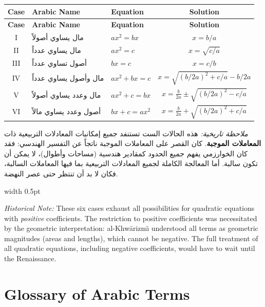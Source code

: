 \documentclass[10pt,a4paper]{book}
\newlength{\colwidth}
\newcommand{\bilingualpair}[2]{%
  \noindent
  \begin{minipage}[t]{\colwidth}
  \begin{flushright}
  \vspace{0pt}
  {\arabicfont\small #1}
  \end{flushright}
  \end{minipage}%
  \hfill\textcolor{columnsepclr}{\vrule width 0.5pt}\hfill
  \begin{minipage}[t]{\colwidth}
  \vspace{0pt}
  {\small #2}
  \end{minipage}%
  \par\vspace{0.6em}
}
\newcommand{\cnote}[1]{\textcolor{notecolor}{\textit{#1}}}
\begin{document}
\vspace{0.5em}
\begin{center}
\renewcommand{\arraystretch}{1.6}
\begin{longtable}{|c|l|l|c|}
\hline
\textbf{Case} & \textbf{Arabic Name} & \textbf{Equation} & \textbf{Solution} \\
\hline
\endfirsthead
\hline
\textbf{Case} & \textbf{Arabic Name} & \textbf{Equation} & \textbf{Solution} \\
\hline
\endhead
\hline
\endfoot
I & مال يساوي أصولاً & $ax^2 = bx$ & $x = b/a$ \\
\hline
II & مال يساوي عدداً & $ax^2 = c$ & $x = \sqrt{c/a}$ \\
\hline
III & أصول تساوي عدداً & $bx = c$ & $x = c/b$ \\
\hline
IV & مال وأصول يساوي عدداً & $ax^2 + bx = c$ & $x = \sqrt{(b/2a)^2 + c/a} - b/2a$ \\
\hline
V & مال وعدد يساوي أصولاً & $ax^2 + c = bx$ & $x = \frac{b}{2a} \pm \sqrt{(b/2a)^2 - c/a}$ \\
\hline
VI & أصول وعدد يساوي مالاً & $bx + c = ax^2$ & $x = \frac{b}{2a} + \sqrt{(b/2a)^2 + c/a}$ \\
\hline
\end{longtable}
\end{center}

\vspace{0.5cm}

\bilingualpair{
\textit{ملاحظة تاريخية:} هذه الحالات الست تستنفد جميع إمكانيات
المعادلات التربيعية ذات \textbf{المعاملات الموجبة}. كان القصر
على المعاملات الموجبة ناتجاً عن التفسير الهندسي: فقد كان
الخوارزمي يفهم جميع الحدود كمقادير هندسية (مساحات وأطوال)،
لا يمكن أن تكون سالبة. أما المعالجة الكاملة لجميع المعادلات
التربيعية بما فيها المعاملات السالبة، فكان لا بد أن تنتظر حتى
عصر النهضة.
}{
\cnote{Historical Note:} These six cases exhaust all possibilities for
quadratic equations with \textit{positive} coefficients. The restriction to
positive coefficients was necessitated by the geometric interpretation:
al-Khw\=arizm\"{\i} understood all terms as geometric magnitudes (areas and
lengths), which cannot be negative. The full treatment of all quadratic
equations, including negative coefficients, would have to wait until the
Renaissance.
}

\chapter{Glossary of Arabic Terms}
\label{app:glossary}
\end{document}
